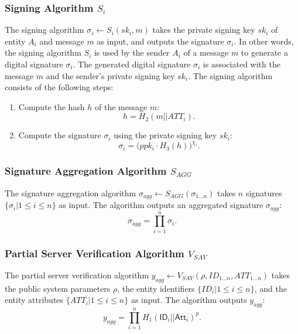 \subsubsection{Signing Algorithm $S_i$}
The signing algorithm $\sigma_{i} \leftarrow S_i(sk_i, m)$ takes the private signing key $sk_i$ of entity $A_i$ and message $m$ as input, and outputs the signature $\sigma_{i}$.
In other words, the signing algorithm $S_i$ is used by the sender $A_i$ of a message $m$ to generate a digital signature $\sigma_{i}$.
The generated digital signature $\sigma_{i}$ is associated with the message $m$ and the sender's private signing key $sk_i$.
The signing algorithm consists of the following steps:
\begin{enumerate}
    \item Compute the hash $h$ of the message $m$:
    \[
        h = H_2(m || ATT_i).
    \]
    \item Compute the signature $\sigma_i$ using the private signing key $sk_i$:
    \[
        \sigma_i = \big(ppk_i \cdot H_3(h)\big)^{\chi_i}.
    \]
\end{enumerate}

\subsubsection{Signature Aggregation Algorithm $S_{AGG}$}
The signature aggregation algorithm $\sigma_{agg} \leftarrow S_{AGG}(\sigma_{1 \dots n})$ takes $n$ signatures $\{\sigma_i | 1 \leq i \leq n\}$ as input.
The algorithm outputs an aggregated signature $\sigma_{agg}$:
\[
    \sigma_{agg} = \prod_{i=1}^n \sigma_i.
\]

\subsubsection{Partial Server Verification Algorithm $V_{SAV}$}
The partial server verification algorithm $y_{agg} \leftarrow V_{SAV}(\rho, ID_{1 \dots n}, ATT_{1 \dots n})$ takes the public system parameters $\rho$, the entity identifiers $\{ID_i | 1 \leq i \leq n\}$, and the entity attributes $\{ATT_i | 1 \leq i \leq n\}$ as input.
The algorithm outputs $y_{agg}$:
\[
    y_{agg} = \prod_{i=1}^n H_1(\mathsf{ID}_i || \mathsf{Att}_i)^{p}.
\]

